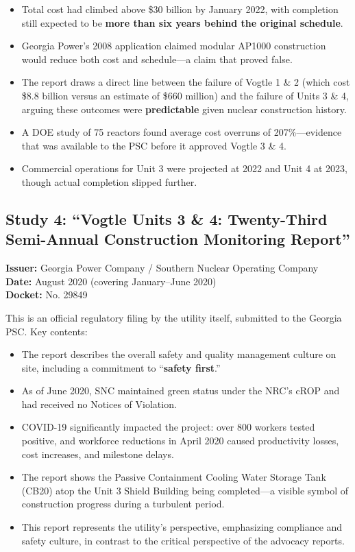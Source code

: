 \documentclass[12pt,a4paper]{article}
\begin{document}
\begin{itemize}
    \item Total cost had climbed above \$30 billion by January 2022, with completion
          still expected to be \textbf{more than six years behind the original schedule}.
    \item Georgia Power's 2008 application claimed modular AP1000 construction would
          reduce both cost and schedule---a claim that proved false.
    \item The report draws a direct line between the failure of Vogtle 1 \& 2 (which
          cost \$8.8 billion versus an estimate of \$660 million) and the failure of
          Units 3 \& 4, arguing these outcomes were \textbf{predictable} given nuclear
          construction history.
    \item A DOE study of 75 reactors found average cost overruns of 207\%---evidence
          that was available to the PSC before it approved Vogtle 3 \& 4.
    \item Commercial operations for Unit 3 were projected at 2022 and Unit 4 at 2023,
          though actual completion slipped further.
\end{itemize}

\subsection{Study 4: ``Vogtle Units 3 \& 4: Twenty-Third Semi-Annual Construction Monitoring Report''}

\textbf{Issuer:} Georgia Power Company / Southern Nuclear Operating Company\\
\textbf{Date:} August 2020 (covering January--June 2020)\\
\textbf{Docket:} No. 29849

This is an official regulatory filing by the utility itself, submitted to the
Georgia PSC. Key contents:

\begin{itemize}
    \item The report describes the overall safety and quality management culture on site,
          including a commitment to ``\textbf{safety first}.''
    \item As of June 2020, SNC maintained green status under the NRC's cROP and
          had received no Notices of Violation.
    \item COVID-19 significantly impacted the project: over 800 workers tested positive,
          and workforce reductions in April 2020 caused productivity losses, cost increases,
          and milestone delays.
    \item The report shows the Passive Containment Cooling Water Storage Tank (CB20)
          atop the Unit 3 Shield Building being completed---a visible symbol of construction
          progress during a turbulent period.
    \item This report represents the utility's perspective, emphasizing compliance and
          safety culture, in contrast to the critical perspective of the advocacy reports.
\end{itemize}
\end{document}
